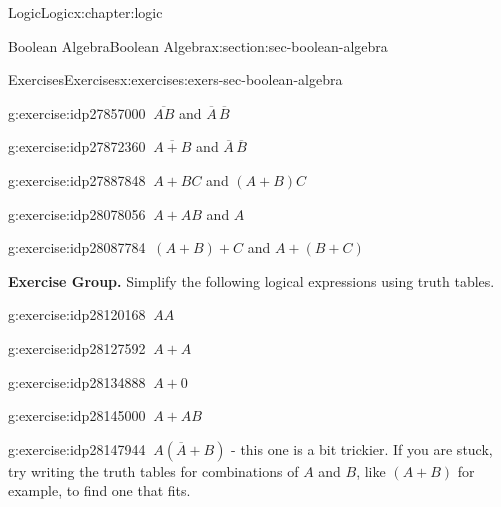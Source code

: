 \documentclass[twoside,10pt,]{book}
\numberwithin{equation}{section}
\begin{document}
\begin{chapterptx}{Logic}{}{Logic}{}{}{x:chapter:logic}
\begin{sectionptx}{Boolean Algebra}{}{Boolean Algebra}{}{}{x:section:sec-boolean-algebra}
\begin{exercises-subsection}{Exercises}{}{Exercises}{}{}{x:exercises:exers-sec-boolean-algebra}
\begin{exercisegroup}
\begin{divisionexerciseeg}{25}{}{}{g:exercise:idp27857000}%
\(\ \overline{AB}\) and \(\overline{A}\,\overline{B}\)\end{divisionexerciseeg}%
\begin{divisionexerciseeg}{26}{}{}{g:exercise:idp27872360}%
\(\ \overline{A+B}\) and \(\overline{A}\,\overline{B}\)\end{divisionexerciseeg}%
\begin{divisionexerciseeg}{27}{}{}{g:exercise:idp27887848}%
\(\ A+BC\) and \((A+B)C\)\end{divisionexerciseeg}%
\begin{divisionexerciseeg}{28}{}{}{g:exercise:idp28078056}%
\(\ A+AB\) and \(A\)\end{divisionexerciseeg}%
\begin{divisionexerciseeg}{29}{}{}{g:exercise:idp28087784}%
\(\ (A+B)+C\) and \(A+(B+C)\)\end{divisionexerciseeg}%
\end{exercisegroup}
\par\medskip\noindent
\par\medskip\noindent%
\textbf{Exercise Group.}\space\space%
Simplify the following logical expressions using truth tables.\begin{exercisegroup}
\begin{divisionexerciseeg}{30}{}{}{g:exercise:idp28120168}%
\(\ AA\)\end{divisionexerciseeg}%
\begin{divisionexerciseeg}{31}{}{}{g:exercise:idp28127592}%
\(\ A+A\)\end{divisionexerciseeg}%
\begin{divisionexerciseeg}{32}{}{}{g:exercise:idp28134888}%
\(\ A+0\)\end{divisionexerciseeg}%
\begin{divisionexerciseeg}{33}{}{}{g:exercise:idp28145000}%
\(\ A+AB\)\end{divisionexerciseeg}%
\begin{divisionexerciseeg}{34}{}{}{g:exercise:idp28147944}%
\(\ A(\overline{A}+B)\) - this one is a bit trickier.  If you are stuck, try writing the truth tables for combinations of \(A\) and \(B\), like \((A+B)\) for example, to find one that fits.\end{divisionexerciseeg}%
\end{exercisegroup}
\par\medskip\noindent
\end{exercises-subsection}

\end{sectionptx}
\end{chapterptx}
\end{document}
